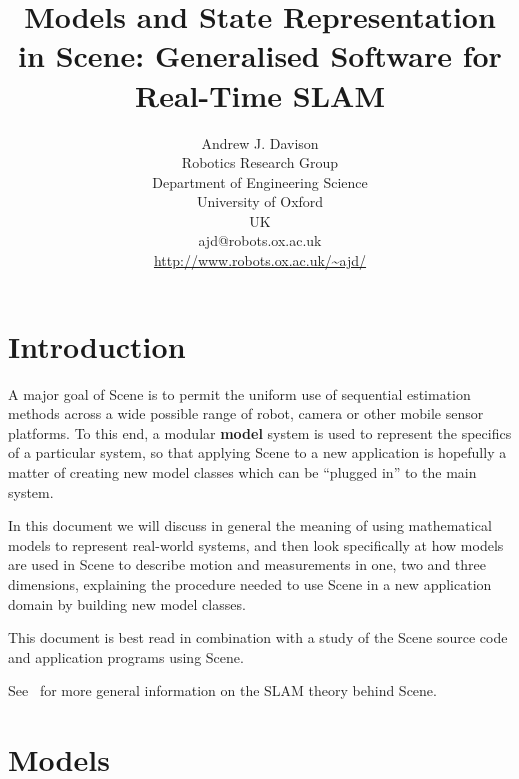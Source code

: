 \documentclass{article}
\begin{document}







\title{{Models and State Representation in Scene: Generalised Software
    for Real-Time SLAM} }

\author{Andrew J. Davison\\
  Robotics Research Group\\
  Department of Engineering Science\\
  University of Oxford\\
  UK\\
  ajd@robots.ox.ac.uk\\
  \url{http://www.robots.ox.ac.uk/~ajd/}
}

\maketitle


\section{Introduction}
\label{section:introduction}

A major goal of Scene is to permit the uniform use of sequential
estimation methods across a wide possible range of robot, camera
or other mobile sensor platforms. To this end, a modular {\bf model}
system is used to represent the specifics of a particular system, so
that applying Scene to a new application is hopefully a matter of
creating new model classes which can be ``plugged in'' to the main
system.

In this document we will discuss in general the meaning of using
mathematical models to represent real-world systems, and then look
specifically at how models are used in Scene to describe motion and
measurements in one, two and three dimensions, explaining the
procedure needed to use Scene in a new application domain by building
new model classes.

This document is best read in combination with a study of the Scene source
code and application programs using Scene.

See~\cite{Davison:Kita:Smile2000} for more general information
on the SLAM theory behind Scene. 

\section{Models}
\end{document}
